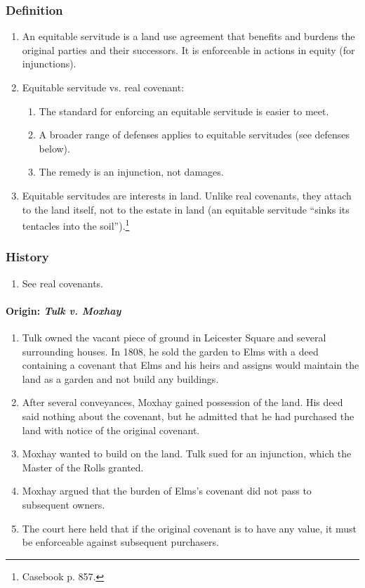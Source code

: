 \subsubsection{Definition}

\begin{enumerate}
    \item An equitable servitude is a land use agreement that benefits and 
    burdens the original parties and their successors. It is enforceable in 
    actions in equity (for injunctions).
    \item Equitable servitude vs. real covenant:
    \begin{enumerate}
        \item The standard for enforcing an equitable servitude is easier to 
        meet.
        \item A broader range of defenses applies to equitable servitudes (see 
        defenses below).
        \item The remedy is an injunction, not damages.
    \end{enumerate}
    \item Equitable servitudes are interests in land. Unlike real covenants, 
    they attach to the land itself, not to the estate in land (an equitable 
    servitude ``sinks its tentacles into the soil'').\footnote{Casebook p. 
    857.}
\end{enumerate}

\subsubsection{History}

\begin{enumerate}
    \item See real covenants.
\end{enumerate}

\paragraph{Origin: \emph{Tulk v. Moxhay}}

\begin{enumerate}
    \item Tulk owned the vacant piece of ground in Leicester Square and 
    several surrounding houses. In 1808, he sold the garden to Elms with a 
    deed containing a covenant that Elms and his heirs and assigns would 
    maintain the land as a garden and not build any buildings.
    \item After several conveyances, Moxhay gained possession of the land. His 
    deed said nothing about the covenant, but he admitted that he had 
    purchased the land with notice of the original covenant.
    \item Moxhay wanted to build on the land. Tulk sued for an injunction, 
    which the Master of the Rolls granted.
    \item Moxhay argued that the burden of Elms's covenant did not pass to 
    subsequent owners.
    \item The court here held that if the original covenant is to have any 
    value, it must be enforceable against subsequent purchasers.
\end{enumerate}

